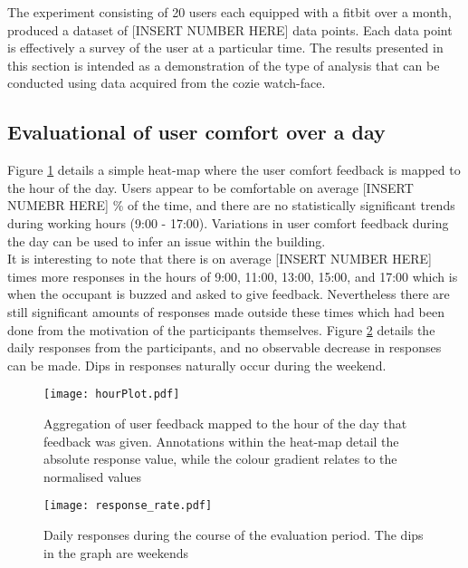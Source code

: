 
The experiment consisting of 20 users each equipped with a fitbit over a month, produced a dataset of [INSERT NUMBER HERE] data points. Each data point is effectively a survey of the user at a particular time. The results presented in this section is intended as a demonstration of the type of analysis that can be conducted using data acquired from the cozie watch-face.


\subsection{Evaluational of user comfort over a day}

Figure \ref{fig:hourPlot} details a simple heat-map where the user comfort feedback is mapped to the hour of the day. Users appear to be comfortable on average [INSERT NUMEBR HERE] \% of the time, and there are no statistically significant trends during working hours (9:00 - 17:00). Variations in user comfort feedback during the day can be used to infer an issue within the building.\\

It is interesting to note that there is on average [INSERT NUMBER HERE] times more responses in the hours of 9:00, 11:00, 13:00, 15:00, and 17:00 which is when the occupant is buzzed and asked to give feedback. Nevertheless there are still significant amounts of responses made outside these times which had been done from the motivation of the participants themselves. Figure \ref{fig:responseRate} details the daily responses from the participants, and no observable decrease in responses can be made. Dips in responses naturally occur during the weekend. 

\begin{figure}
\begin{center}
\texttt{[image: hourPlot.pdf]}
\caption{Aggregation of user feedback mapped to the hour of the day that feedback was given. Annotations within the heat-map detail the absolute response value, while the colour gradient relates to the normalised values}
\label{fig:hourPlot}
\end{center}
\end{figure}

\begin{figure}
\begin{center}
\texttt{[image: response\_rate.pdf]}
\caption{Daily responses during the course of the evaluation period. The dips in the graph are weekends}
\label{fig:responseRate}
\end{center}
\end{figure}

